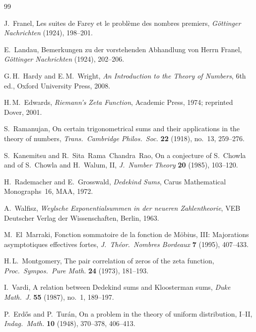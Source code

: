 \documentclass[11pt]{article}
\theoremstyle{definition}
\begin{document}
\begin{thebibliography}{99}

J.~Franel,
Les suites de Farey et le probl\`eme des nombres premiers,
\textit{G\"ottinger Nachrichten} (1924), 198--201.

E.~Landau,
Bemerkungen zu der vorstehenden Abhandlung von Herrn Franel,
\textit{G\"ottinger Nachrichten} (1924), 202--206.

G.\,H.~Hardy and E.\,M.~Wright,
\textit{An Introduction to the Theory of Numbers},
6th ed., Oxford University Press, 2008.

H.\,M.~Edwards,
\textit{Riemann's Zeta Function},
Academic Press, 1974; reprinted Dover, 2001.

S.~Ramanujan,
On certain trigonometrical sums and their applications
in the theory of numbers,
\textit{Trans.\ Cambridge Philos.\ Soc.}
\textbf{22} (1918), no.~13, 259--276.

S.~Kanemitsu and R.~Sita~Rama~Chandra~Rao,
On a conjecture of S.~Chowla and of S.~Chowla and H.~Walum, II,
\textit{J.~Number Theory} \textbf{20} (1985), 103--120.

H.~Rademacher and E.~Grosswald,
\textit{Dedekind Sums},
Carus Mathematical Monographs~16, MAA, 1972.

A.~Walfisz,
\textit{Weylsche Exponentialsummen in der neueren Zahlentheorie},
VEB Deutscher Verlag der Wissenschaften, Berlin, 1963.

M.~El~Marraki,
Fonction sommatoire de la fonction de M\"obius, III:
Majorations asymptotiques effectives fortes,
\textit{J.~Th\'eor.~Nombres Bordeaux} \textbf{7} (1995), 407--433.

H.\,L.~Montgomery,
The pair correlation of zeros of the zeta function,
\textit{Proc.\ Sympos.\ Pure Math.}
\textbf{24} (1973), 181--193.

I.~Vardi,
A relation between Dedekind sums and Kloosterman sums,
\textit{Duke Math.~J.} \textbf{55} (1987), no.~1, 189--197.

P.~Erd\H{o}s and P.~Tur\'an,
On a problem in the theory of uniform distribution, I--II,
\textit{Indag.\ Math.} \textbf{10} (1948), 370--378, 406--413.


\end{thebibliography}
\end{document}
